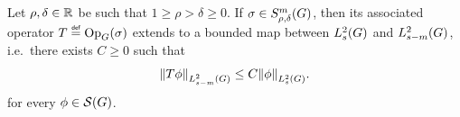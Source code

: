 \begin{theorem}
\label{theorem:L2_boundedness}
    Let $\rho, \delta \in \R$ be such that $1 \geq \rho > \delta \geq 0$.
    If $\sigma \in \SymbolClass m {\rho, \delta}$,
    then its associated operator $T \defeq \Op(\sigma)$ extends to a bounded map
    between $\Sobolev s$ and $\Sobolev {s - m}$,
    i.e.\ there exists $C \geq 0$ such that
    \begin{align*}
        \norm [\Sobolev {s - m}] {T \phi} \leq C \norm [\Sobolev s] \phi.
    \end{align*}
    for every $\phi \in \Schwartz \Group$.
\end{theorem}

%
%
